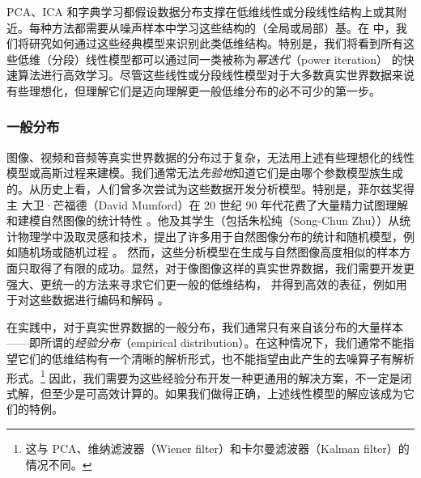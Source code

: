 \documentclass[../../book-main_zh.tex]{subfiles}
\begin{document}
PCA、ICA
和字典学习都假设数据分布支撑在低维线性或分段线性结构上或其附近。每种方法都需要从噪声样本中学习这些结构的（全局或局部）基。在
中，我们将研究如何通过这些经典模型来识别此类低维结构。特别是，我们将看到所有这些低维（分段）线性模型都可以通过同一类被称为\textit{幂迭代}（power
iteration）\cite{Zhai-2020}
的快速算法进行高效学习。尽管这些线性或分段线性模型对于大多数真实世界数据来说有些理想化，但理解它们是迈向理解更一般低维分布的必不可少的第一步。

\subsubsection{一般分布}\label{sec:denoising-intro}

图像、视频和音频等真实世界数据的分布过于复杂，无法用上述有些理想化的线性模型或高斯过程来建模。我们通常无法\textit{先验地}知道它们是由哪个参数模型族生成的。从历史上看，人们曾多次尝试为这些数据开发分析模型。特别是，菲尔兹奖得主
大卫·芒福德（David Mumford）在 20 世纪 90 年代花费了大量精力试图理解和建模自然图像的统计特性
\cite{Mumford1996TheSD}。他及其学生（包括朱松纯（Song-Chun
Zhu））从统计物理学中汲取灵感和技术，提出了许多用于自然图像分布的统计和随机模型，例如随机场或随机过程
\cite{Zhu-Entropy-1997,Zhu1997LearningGP,Zhu1997Prior,Huang-Mumford,Mumford-1999,Lee-Mumford}。
然而，这些分析模型在生成与自然图像高度相似的样本方面只取得了有限的成功。显然，对于像图像这样的真实世界数据，我们需要开发更强大、更统一的方法来寻求它们更一般的低维结构，
并得到高效的表征，例如用于对这些数据进行编码和解码 \cite{ALLARD2012435,LITTLE2017504}。

在实践中，对于真实世界数据的一般分布，我们通常只有来自该分布的大量样本——即所谓的\textit{经验分布}（empirical
distribution）。在这种情况下，我们通常不能指望它们的低维结构有一个清晰的解析形式，也不能指望由此产生的去噪算子有解析形式。\footnote{这与
PCA、维纳滤波器（Wiener filter）和卡尔曼滤波器（Kalman filter）的情况不同。}
因此，我们需要为这些经验分布开发一种更通用的解决方案，不一定是闭式解，但至少是可高效计算的。如果我们做得正确，上述线性模型的解应该成为它们的特例。
\end{document}
